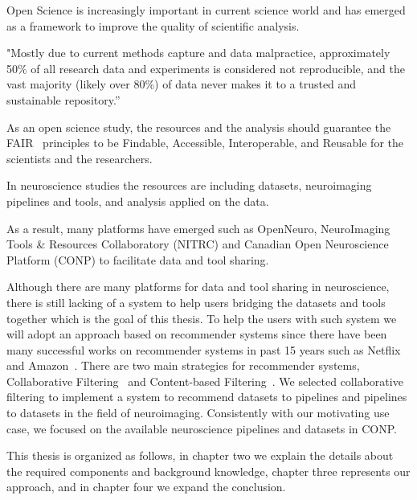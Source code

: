 Open Science is increasingly important in current science world and has emerged as a framework to improve the quality of scientific analysis.

"Mostly due to current methods capture and data 
malpractice, approximately 
50\% of all research data 
and experiments is considered 
not reproducible, 
and the vast majority (likely over 80\%) of data 
never makes it to a trusted and sustainable 
repository.”~\cite{ayris2016realising} 



As an open science study, the resources and the analysis should guarantee the FAIR~\cite{wilkinson2016fair} principles to be Findable, Accessible, Interoperable, and Reusable for the scientists and the researchers. 

In neuroscience studies the resources are including datasets, neuroimaging pipelines and tools, and analysis applied on the data.




As a result, many platforms have emerged such as OpenNeuro, NeuroImaging Tools \& Resources Collaboratory (NITRC) and Canadian Open Neuroscience Platform (CONP) to facilitate data and tool sharing.


Although there are many platforms for data and tool sharing in neuroscience, there is still lacking of a system to help users  bridging the datasets and tools together which is the goal of this thesis. To help the users with such system we will adopt an approach based on recommender systems since there have been many successful works on recommender systems in past 15 years such as Netflix~\cite{bennett2007netflix} and Amazon~\cite{7927889}. There are two main strategies for recommender systems, Collaborative Filtering~\cite{rajaraman2011mining} and Content-based Filtering~\cite{pazzani2007content}. We selected collaborative filtering to implement a system to recommend datasets to pipelines and pipelines to datasets in the field of neuroimaging. Consistently with our motivating use case, we focused on the available neuroscience pipelines and datasets in CONP. 


This thesis is organized as follows, in chapter two we explain the details about the required components and background knowledge, chapter three represents our approach, and in chapter four we expand the conclusion. 


